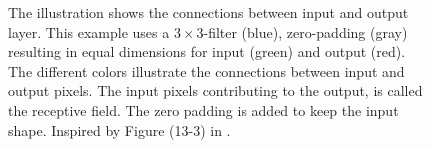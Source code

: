 \begin{figure}
    \caption{The illustration shows the connections between input and output layer. This example uses a $3\times 3$-filter (blue), zero-padding (gray) resulting in equal dimensions for input (green) and output (red). The different colors illustrate the connections between input and output pixels. The input pixels contributing to the output, is called the receptive field. The zero padding is added to keep the input shape. Inspired by Figure (13-3) in \cite{OReiley_book}. 
    }
    \label{fig:convolution_padding}
\end{figure}